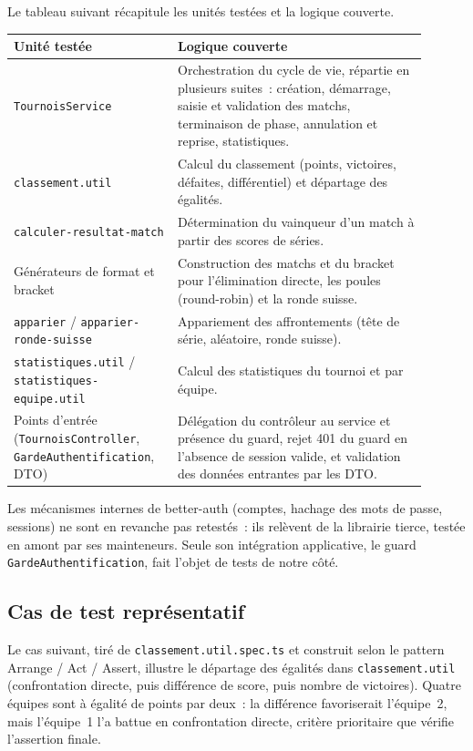 Le tableau suivant récapitule les unités testées et la logique couverte.

\begin{table}[H]
    \centering
    \small
    \renewcommand{\arraystretch}{1.6}
    \begin{tabular}{|>{\raggedright\arraybackslash}p{0.34\linewidth}|>{\raggedright\arraybackslash}p{0.56\linewidth}|}
        \hline
        \textbf{Unité testée} & \textbf{Logique couverte} \\
        \hline
        \texttt{TournoisService} & Orchestration du cycle de vie, répartie en plusieurs suites~: création, démarrage, saisie et validation des matchs, terminaison de phase, annulation et reprise, statistiques. \\
        \hline
        \texttt{classement.util} & Calcul du classement (points, victoires, défaites, différentiel) et départage des égalités. \\
        \hline
        \texttt{calculer-resultat-match} & Détermination du vainqueur d'un match à partir des scores de séries. \\
        \hline
        Générateurs de format et bracket & Construction des matchs et du bracket pour l'élimination directe, les poules (round-robin) et la ronde suisse. \\
        \hline
        \texttt{apparier} / \texttt{apparier-ronde-suisse} & Appariement des affrontements (tête de série, aléatoire, ronde suisse). \\
        \hline
        \texttt{statistiques.util} / \texttt{statistiques-equipe.util} & Calcul des statistiques du tournoi et par équipe. \\
        \hline
        Points d'entrée (\texttt{TournoisController}, \texttt{GardeAuthentification}, DTO) & Délégation du contrôleur au service et présence du guard, rejet 401 du guard en l'absence de session valide, et validation des données entrantes par les DTO. \\
        \hline
    \end{tabular}
\end{table}

Les mécanismes internes de better-auth (comptes, hachage des mots de passe, sessions) ne sont en revanche pas retestés~: ils relèvent de la librairie tierce, testée en amont par ses mainteneurs. Seule son intégration applicative, le guard \texttt{GardeAuthentification}, fait l'objet de tests de notre côté.

\subsection{Cas de test représentatif}
Le cas suivant, tiré de \texttt{classement.util.spec.ts} et construit selon le pattern Arrange / Act / Assert, illustre le départage des égalités dans \texttt{classement.util} (confrontation directe, puis différence de score, puis nombre de victoires). Quatre équipes sont à égalité de points par deux~: la différence favoriserait l'équipe~2, mais l'équipe~1 l'a battue en confrontation directe, critère prioritaire que vérifie l'assertion finale.

